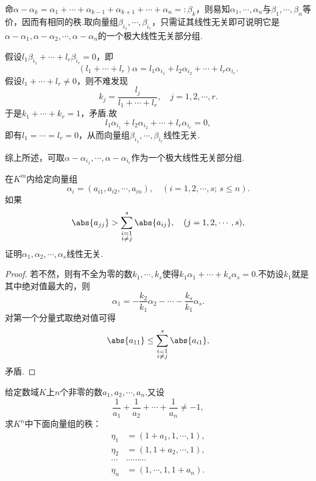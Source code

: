 \begin{sol}
	命$\alpha-\alpha_k=\alpha_1+\cdots+\alpha_{k-1}+\alpha_{k+1}+\cdots+\alpha_n=:\beta_k$，则易知$\alpha_1,\cdots,\alpha_n$与$\beta_1,\cdots,\beta_n$等价，因而有相同的秩.取向量组$\beta_{i_1},\cdots,\beta_{i_r}$，只需证其线性无关即可说明它是$\alpha-\alpha_1,\alpha-\alpha_2,\cdots,\alpha-\alpha_n$的一个极大线性无关部分组.

	假设$l_1\beta_{i_1}+\cdots+l_r\beta_{i_r}=0$，即
	\[
		(l_1+\cdots+l_r)\alpha=l_1\alpha_{i_1}+l_2\alpha_{i_2}+\cdots+l_r\alpha_{i_r}.
	\]
	假设$l_1+\cdots+l_r\ne0$，则不难发现
	\[
		k_j=\frac{l_j}{l_1+\cdots+l_r},\quad j=1,2,\cdots,r.
	\]
	于是$k_1+\cdots+k_r=1$，矛盾.故
	\[
		l_1\alpha_{i_1}+l_2\alpha_{i_2}+\cdots+l_r\alpha_{i_r}=0,
	\]
	即有$l_1=\cdots=l_r=0$，从而向量组$\beta_{i_1},\cdots,\beta_{i_r}$线性无关.

	综上所述，可取$\alpha-\alpha_{i_1},\cdots,\alpha-\alpha_{i_r}$作为一个极大线性无关部分组.
\end{sol}
\begin{prob}[24]
	在$K^m$内给定向量组
	\[
		\alpha_i=(a_{i1},a_{i2},\cdots,a_{in}),\quad(i=1,2,\cdots,s;\,s\le n).
	\]
	如果
	\[
		\abs{a_{jj}}>\sum_{\substack{i=1\\ i\ne j}}^s\abs{a_{ij}},\quad(j=1,2,\cdots,s),
	\]
	证明$\alpha_1,\alpha_2,\cdots,\alpha_s$线性无关.
\end{prob}
\begin{proof}
	若不然，则有不全为零的数$k_1,\cdots,k_s$使得$k_1\alpha_1+\cdots+k_s\alpha_s=0$.不妨设$k_1$就是其中绝对值最大的，则
	\[
		\alpha_1=-\frac{k_2}{k_1}\alpha_2-\cdots-\frac{k_s}{k_1}\alpha_s.
	\]
	对第一个分量式取绝对值可得
	\[
		\abs{a_{11}}\le\sum_{\substack{i=1\\ i\ne j}}^s\abs{a_{i1}},
	\]
	矛盾.
\end{proof}
\begin{prob}[25]
	给定数域$K$上$n$个非零的数$a_1,a_2,\cdots,a_n$.又设
	\[
		\frac{1}{a_1}+\frac{1}{a_2}+\cdots+\frac{1}{a_n}\ne-1,
	\]
	求$K^n$中下面向量组的秩：
	\begin{align*}
		\eta_1 & =(1+a_1,1,\cdots,1), \\
		\eta_2 & =(1,1+a_2,\cdots,1), \\
		\cdots & \cdots\cdots\cdots   \\
		\eta_n & =(1,\cdots,1,1+a_n).
	\end{align*}
\end{prob}
